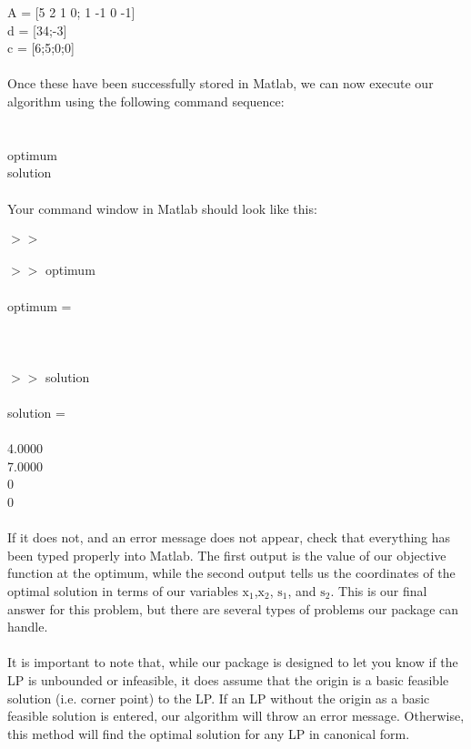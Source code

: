 \documentclass[12pt]{article}
\begin{document}
A = [5 2 1 0; 1 -1 0 -1] \\
d = [34;-3] \\
c = [6;5;0;0] \\
\\
\quad Once these have been successfully stored in Matlab, we can now execute our algorithm using the following command sequence:\\
\\
 \\
optimum \\
solution \\
\\
Your command window in Matlab should look like this:\\
\\
$>>$  \\
\\
$>>$ optimum\\
\\
optimum = \\
\\
 \\
\\
$>>$ solution \\ 
\\
solution = \\
\\
4.0000 \\
7.0000 \\
 0 \\
 0 \\
\\
If it does not, and an error message does not appear, check that everything has been typed properly into Matlab. The first output is the value of our objective function at the optimum, while the second output tells us the coordinates of the optimal solution in terms of our variables $\text{x}_{1}$,$\text{x}_{2}$, $\text{s}_{1}$, and $\text{s}_{2}$. This is our final answer for this problem, but there are several types of problems our package can handle.\\
\\
\quad It is important to note that, while our package is designed to let you know if the LP is unbounded or infeasible, it does assume that the origin is a basic feasible solution (i.e. corner point) to the LP. If an LP without the origin as a basic feasible solution is entered, our algorithm will throw an error message. Otherwise, this method will find the optimal solution for any LP in canonical form. \\
\end{document}
